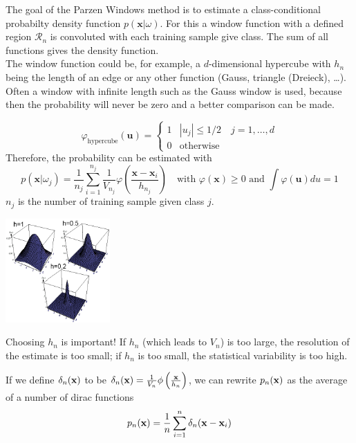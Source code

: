   	The goal of the Parzen Windows method is to estimate a class-conditional probabilty density function $p(\bm x | \omega)$. 
    For this a window function with a defined region $\mathcal{R}_n$ is convoluted with each training sample give class. 
    The sum of all functions gives the density function.\\
    The window function could be, for example, a $d$-dimensional hypercube with $h_n$ being the length of an edge or any other function 
    (Gauss, triangle (Dreieck), \ldots). 
    Often a window with infinite length such as the Gauss window is used, because then the probability will never be zero and a better comparison can be made.\\
    \begin{minipage}{13cm}
    	$$\varphi_{\mathrm{hypercube}}(\bm{u}) = \begin{cases}
	    1 &|u_j| \leq 1/2 \quad  j=1,\ldots,d\\
	    0 & \text{otherwise}
	    \end{cases}$$
	    Therefore, the probability can be estimated with
	    $$p(\bm{x}|\omega_j) = \frac1{n_j} \sum_{i=1}^{n_j} \frac{1}{V_{n_j}} \varphi \left(\frac{\bm{x}-\bm{x}_i}{h_{n_j}} \right) \quad 
	    \text{with } \varphi(\bm{x}) \geq 0 \text{ and } \int \varphi(\bm{u}) du = 1 $$
	    $n_j$ is the number of training sample given class $j$. \\
    \end{minipage}
    \begin{minipage}{5cm}
        \includegraphics[width=4cm]{./images/parzenWindow.png}
    \end{minipage}
    
    Choosing $h_n$ is important! If $h_n$ (which leads to $V_n$) is too large, the resolution of the
    estimate is too small; if $h_n$ is too small, the statistical variability is too high.
    
    If we define $\delta_n(\mathbf{x})$ to be $\delta_n(\mathbf{x}) = \frac{1}{V_n} \phi\left(\frac{\mathbf{x}}{h_n}\right)$,
    we can rewrite $p_n(\mathbf{x})$ as the average of a number of dirac functions 
    \begin{equation*}
      p_n(\mathbf{x}) = \frac{1}{n}\sum\limits_{i=1}^{n}\delta_n(\mathbf{x}-\mathbf{x}_i)
    \end{equation*}
   
